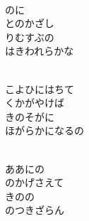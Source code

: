 \documentclass[10pt,b5j]{tarticle} %
\begin{document}
\begin{enumerate}
\begin{minipage}[c]{\blocksize}
    \end{minipage}
    \begin{minipage}[c]{\blocksize}
        
        \vspace{\linespace}
        \item~\\
        のに\\
        とのかざし\\
        りむすぶの\\
        はきわれらかな
        
    \end{minipage}
    \begin{minipage}[c]{\blocksize}
        
        \vspace{\linespace}
        \item~\\
        こよひにはちて\\
        くかがやけば\\
        きのそがに\\
        ほがらかになるの
        
    \end{minipage}
    \begin{minipage}[c]{\blocksize}
        
        \vspace{\linespace}
        \item~\\
        ああにの\\
        のかげさえて\\
        きのの\\
        のつきざらん
    
    \end{minipage}
\end{enumerate} %
\end{document}
